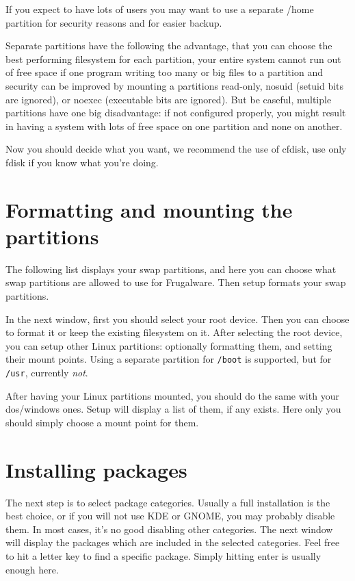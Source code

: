 If you expect to have lots of users you may want to use a
separate /home partition for security reasons and for
easier backup.

Separate partitions have the following the advantage, that
you can choose the best performing filesystem for each
partition, your entire system cannot run out of free space
if one program writing too many or big files to a partition
and security can be improved by mounting a partitions
read-only, nosuid (setuid bits are ignored), or noexec
(executable bits are ignored). But be caseful, multiple
partitions have one big disadvantage: if not configured
properly, you might result in having a system with lots of
free space on one partition and none on another.

Now you should decide what you want, we recommend the use of cfdisk, use only fdisk if you know what you're doing.

\section{Formatting and mounting the partitions}
 
The following list displays your swap partitions, and here you can choose what swap partitions are allowed to use for Frugalware. Then setup formats your swap partitions.

In the next window, first you should select your root device. Then you can choose to format it or keep the existing filesystem on it. After selecting the root device, you can setup other Linux partitions: optionally formatting them, and setting their mount points. Using a separate partition for {\tt /boot} is supported, but for {\tt /usr}, currently \textit{not}.

After having your Linux partitions mounted, you should do the same with your dos/windows ones. Setup will display a list of them, if any exists. Here only you should simply choose a mount point for them.

\section{Installing packages}

The next step is to select package categories. Usually a
full installation is the best choice, or if you will not
use KDE or GNOME, you may probably disable them. In most
cases, it's no good disabling other categories. The next
window will display the packages which are included in the
selected categories. Feel free to hit a letter key to find
a specific package. Simply hitting enter is usually enough
here. 

